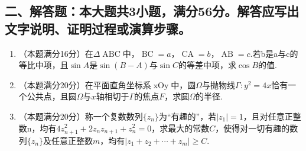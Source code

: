 \documentclass[UTF8]{ctexart}
\newcommand{\tmop}[1]{\ensuremath{\operatorname{#1}}}
\begin{document}
\subsection*{二、解答题：本大题共3小题，满分56分。解答应写出文字说明、证明过程或演算步骤。}

\begin{enumerate}
  \item （本题满分16分）在$\Delta \tmop{ABC}$中，$\tmop{BC} =
  a$，$\tmop{CA} = b$，$\tmop{AB} =
  c$.若b是a与c的等比中项，且$\sin A$是$\sin (B - A)$与$\sin
  C$的等差中项，求$\cos B$的值.
  
  \item
  （本题满分20分）在平面直角坐标系$\tmop{xOy}$中，圆$\Omega$与抛物线$\Gamma
  : y^2 = 4
  x$恰有一个公共点，且圆$\Omega$与$x$轴相切于$\Gamma$的焦点$F$，求圆$\Omega$的半径.
  
  \item （本题满分20分）称一个复数数列$\{ z_n
  \}$为``有趣的''，若$| z_1 | = 1$，且对任意正整数n，均有$4
  z_{n + 1}^2 + 2 z_n z_{n + 1} + z_n^2 =
  0$，求最大的常数$C$，使得对一切有趣的数列$\{ z_n
  \}$及任意正整数$m$，均有$| z_1 + z_2 + \cdots + z_m | \geqslant C$.
\end{enumerate}
\end{document}
